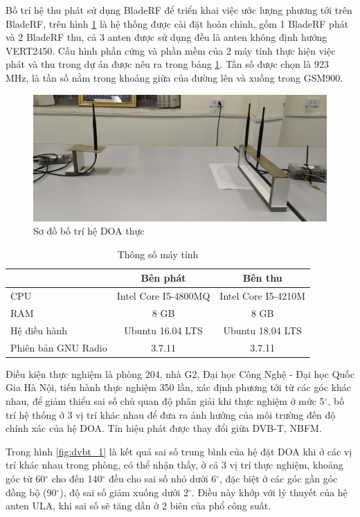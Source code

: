 {Bố trí hệ thu phát sử dụng BladeRF để triển khai việc ước lượng phương tới trên BladeRF, trên hình \ref{fig:realsys} là hệ thống được cài đặt hoàn chỉnh, gồm 1 BladeRF phát và 2 BladeRF thu, cả 3 anten được sử dụng đều là anten không định hướng VERT2450. Cấu hình phần cứng và phần mềm của 2 máy tính thực hiện việc phát và thu trong dự án được nêu ra trong bảng \ref{table:hw}. Tần số được chọn là 923 MHz, là tần số nằm trong khoảng giữa của đường lên và xuống trong GSM900.
\begin{figure} [!h]
	\centering
	\includegraphics[width=1\linewidth]{figures/realsys.jpg}
	\caption{Sơ đồ bố trí hệ DOA thực}
	\label{fig:realsys}
\end{figure}
\begin{table}[!h]
\centering
\begin{tabular}{lcc}
\hline
\rowcolor[HTML]{FFE8E7} 
\multicolumn{1}{c}{\cellcolor[HTML]{FFE8E7}\textbf{Thông số}} & \textbf{Bên phát} & \textbf{Bên thu} \\ \hline
CPU & Intel Core I5-4800MQ & Intel Core I5-4210M \\
RAM & 8 GB & 8 GB \\
Hệ điều hành & Ubuntu 16.04 LTS & Ubuntu 18.04 LTS \\
Phiên bản GNU Radio & 3.7.11 & 3.7.11 \\ \hline
\end{tabular}
\caption{Thông số máy tính}
\label{table:hw}
\end{table}

Điều kiện thực nghiệm là phòng 204, nhà G2, Đại học Công Nghệ - Đại học Quốc Gia Hà Nội, tiến hành thực nghiệm 350 lần, xác định phương tới từ các góc khác nhau, để giảm thiểu sai số chủ quan độ phân giải khi thực nghiệm ở mức 5$^{\circ}$, bố trí hệ thống ở 3 vị trí khác nhau để đưa ra ảnh hưởng của môi trường đến độ chính xác của hệ DOA. Tín hiệu phát được thay đổi giữa DVB-T, NBFM.

Trong hình \ref{fig:dvbt_1} là kết quả sai số trung bình của hệ đặt DOA khi ở các vị trí khác nhau trong phòng, có thể nhận thấy, ở cả 3 vị trí thực nghiệm, khoảng góc từ 60$^{\circ}$ cho đến 140$^{\circ}$ đều cho sai số nhỏ dưới 6$^{\circ}$, đặc biệt ở các góc gần góc đồng bộ (90$^{\circ}$), độ sai số giảm xuống dưới 2$^{\circ}$. Điều này khớp với lý thuyết của hệ anten ULA, khi sai số sẽ tăng dần ở 2 biên của phổ công suất.

}
